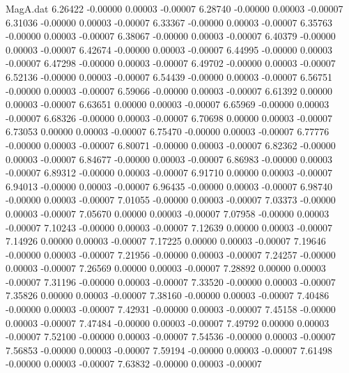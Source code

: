 \begin{filecontents}{MagA.dat}
   6.26422   -0.00000    0.00003   -0.00007
   6.28740   -0.00000    0.00003   -0.00007
   6.31036   -0.00000    0.00003   -0.00007
   6.33367   -0.00000    0.00003   -0.00007
   6.35763   -0.00000    0.00003   -0.00007
   6.38067   -0.00000    0.00003   -0.00007
   6.40379   -0.00000    0.00003   -0.00007
   6.42674   -0.00000    0.00003   -0.00007
   6.44995   -0.00000    0.00003   -0.00007
   6.47298   -0.00000    0.00003   -0.00007
   6.49702   -0.00000    0.00003   -0.00007
   6.52136   -0.00000    0.00003   -0.00007
   6.54439   -0.00000    0.00003   -0.00007
   6.56751   -0.00000    0.00003   -0.00007
   6.59066   -0.00000    0.00003   -0.00007
   6.61392    0.00000    0.00003   -0.00007
   6.63651    0.00000    0.00003   -0.00007
   6.65969   -0.00000    0.00003   -0.00007
   6.68326   -0.00000    0.00003   -0.00007
   6.70698    0.00000    0.00003   -0.00007
   6.73053    0.00000    0.00003   -0.00007
   6.75470   -0.00000    0.00003   -0.00007
   6.77776   -0.00000    0.00003   -0.00007
   6.80071   -0.00000    0.00003   -0.00007
   6.82362   -0.00000    0.00003   -0.00007
   6.84677   -0.00000    0.00003   -0.00007
   6.86983   -0.00000    0.00003   -0.00007
   6.89312   -0.00000    0.00003   -0.00007
   6.91710    0.00000    0.00003   -0.00007
   6.94013   -0.00000    0.00003   -0.00007
   6.96435   -0.00000    0.00003   -0.00007
   6.98740   -0.00000    0.00003   -0.00007
   7.01055   -0.00000    0.00003   -0.00007
   7.03373   -0.00000    0.00003   -0.00007
   7.05670    0.00000    0.00003   -0.00007
   7.07958   -0.00000    0.00003   -0.00007
   7.10243   -0.00000    0.00003   -0.00007
   7.12639    0.00000    0.00003   -0.00007
   7.14926    0.00000    0.00003   -0.00007
   7.17225    0.00000    0.00003   -0.00007
   7.19646   -0.00000    0.00003   -0.00007
   7.21956   -0.00000    0.00003   -0.00007
   7.24257   -0.00000    0.00003   -0.00007
   7.26569    0.00000    0.00003   -0.00007
   7.28892    0.00000    0.00003   -0.00007
   7.31196   -0.00000    0.00003   -0.00007
   7.33520   -0.00000    0.00003   -0.00007
   7.35826    0.00000    0.00003   -0.00007
   7.38160   -0.00000    0.00003   -0.00007
   7.40486   -0.00000    0.00003   -0.00007
   7.42931   -0.00000    0.00003   -0.00007
   7.45158   -0.00000    0.00003   -0.00007
   7.47484   -0.00000    0.00003   -0.00007
   7.49792    0.00000    0.00003   -0.00007
   7.52100   -0.00000    0.00003   -0.00007
   7.54536   -0.00000    0.00003   -0.00007
   7.56853   -0.00000    0.00003   -0.00007
   7.59194   -0.00000    0.00003   -0.00007
   7.61498   -0.00000    0.00003   -0.00007
   7.63832   -0.00000    0.00003   -0.00007

\end{filecontents}

